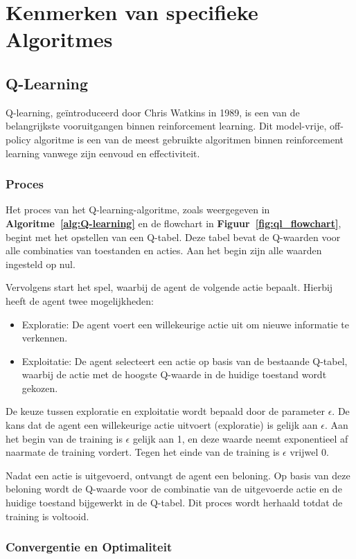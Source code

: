 \documentclass[a4paper,12pt]{report}
\begin{document}
\chapter{Kenmerken van specifieke Algoritmes}

\section{Q-Learning}
Q-learning, geïntroduceerd door Chris Watkins in 1989, is een van de
belangrijkste vooruitgangen binnen reinforcement learning. Dit model-vrije,
off-policy algoritme is een van de meest gebruikte algoritmen binnen
reinforcement learning vanwege zijn eenvoud en effectiviteit.
\subsection{Proces}
Het proces van het Q-learning-algoritme, zoals weergegeven in
\textbf{Algoritme~\ref{alg:Q-learning}} en de flowchart in
\textbf{Figuur~\ref{fig:ql_flowchart}}, begint met het opstellen van een
Q-tabel. Deze tabel bevat de Q-waarden voor alle combinaties van toestanden en
acties. Aan het begin zijn alle waarden ingesteld op nul.

Vervolgens start het spel, waarbij de agent de volgende actie bepaalt. Hierbij
heeft de agent twee mogelijkheden:
\begin{itemize}
    \item Exploratie: De agent voert een willekeurige actie uit om nieuwe informatie te
          verkennen.
    \item Exploitatie: De agent selecteert een actie op basis van de bestaande Q-tabel,
          waarbij de actie met de hoogste Q-waarde in de huidige toestand wordt gekozen.
\end{itemize}

De keuze tussen exploratie en exploitatie wordt bepaald door de parameter
$\epsilon$. De kans dat de agent een willekeurige actie uitvoert (exploratie)
is gelijk aan $\epsilon$. Aan het begin van de training is $\epsilon$ gelijk
aan 1, en deze waarde neemt exponentieel af naarmate de training vordert. Tegen
het einde van de training is $\epsilon$ vrijwel 0.

Nadat een actie is uitgevoerd, ontvangt de agent een beloning. Op basis van
deze beloning wordt de Q-waarde voor de combinatie van de uitgevoerde actie en
de huidige toestand bijgewerkt in de Q-tabel. Dit proces wordt herhaald totdat
de training is voltooid.
\subsection{Convergentie en Optimaliteit}
\end{document}
